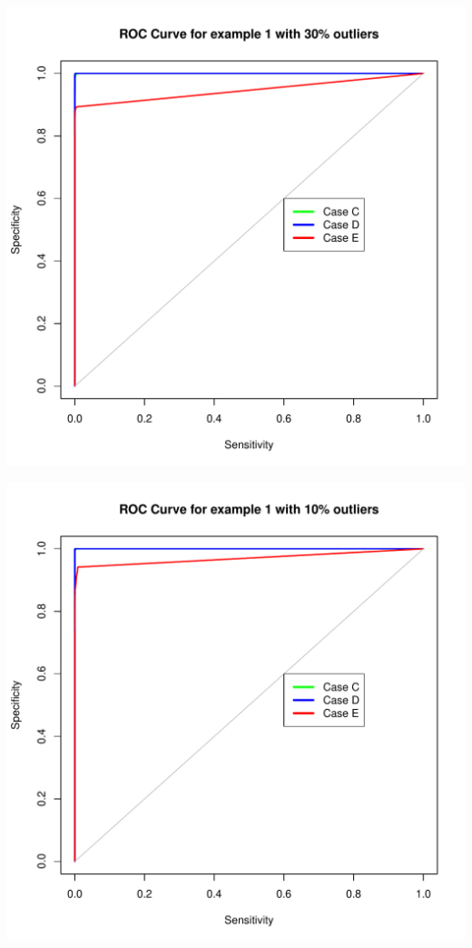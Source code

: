 \documentclass{article}\usepackage[]{graphicx}\usepackage[]{color}
\makeatletter
\def\maxwidth{ %
  \ifdim\Gin@nat@width>\linewidth
    \linewidth
  \else
    \Gin@nat@width
  \fi
}
\newenvironment{knitrout}{}{} %
\makeatother
\begin{document}
\begin{knitrout}
\color{fgcolor}
\includegraphics[width=\maxwidth]{figure/unnamed-chunk-4-1} 

\end{knitrout}
\begin{knitrout}
\color{fgcolor}
\includegraphics[width=\maxwidth]{figure/unnamed-chunk-5-1} 

\end{knitrout}
\end{document}

